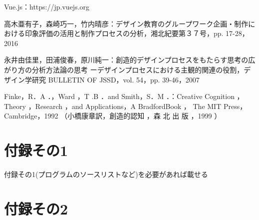 \documentclass{funthesis}
\begin{document}
\begin{thebibliography}{9}
Vue.js：https://jp.vuejs.org

高木亜有子，森崎巧一，竹内晴彦：デザイン教育のグループワーク企画・制作における印象評価の活用と制作プロセスの分析，湘北紀要第３７号，pp. 17-28，2016

永井由佳里，田浦俊春，原川純一：創造的デザインプロセスをもたらす思考の広がり方の分析方法論の思考 ーデザインプロセスにおける主観的関連の役割，デザイン学研究 BULLETIN OF JSSD，vol. 54，pp. 39-46，2007

Finke，R．A ．，Ward ，T .B ．and Smith，S．M ．：Creative Cognition ， Theory ，Research ，and
Applications，A BradfordBook ， The MIT Press，
Cambridge，1992 （小橋康章訳，創造的認知 ，森 北 出
版 ，1999 ）






\end{thebibliography}


\appendix

\chapter*{付録その1} %

付録その1(プログラムのソースリストなど)を必要があれば載せる

\chapter*{付録その2}
\end{document}
